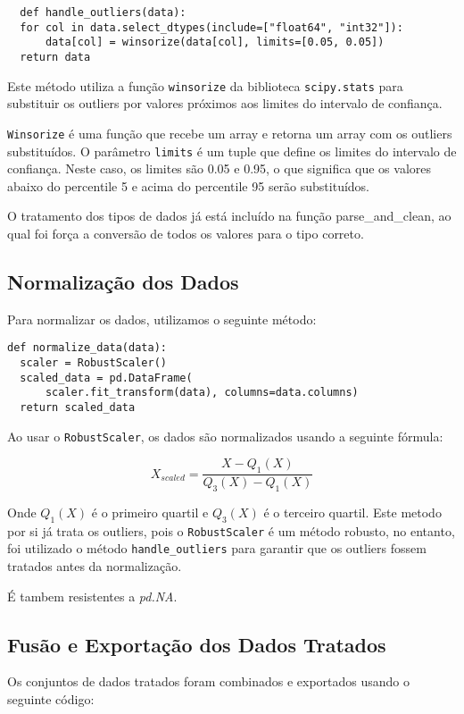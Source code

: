 \documentclass{article}
\begin{document}
\begin{verbatim}
  def handle_outliers(data):
  for col in data.select_dtypes(include=["float64", "int32"]):
      data[col] = winsorize(data[col], limits=[0.05, 0.05])
  return data
\end{verbatim}

Este método utiliza a função \texttt{winsorize} da biblioteca \texttt{scipy.stats} para substituir os outliers por valores próximos aos limites do intervalo de confiança.

\texttt{Winsorize} é uma função que recebe um array e retorna um array com os outliers substituídos. O parâmetro \texttt{limits} é um tuple que define os limites do intervalo de confiança. Neste caso, os limites são 0.05 e 0.95, o que significa que os valores abaixo do percentile 5 e acima do percentile 95 serão substituídos.

O tratamento dos tipos de dados já está incluído na função parse_and_clean, ao qual foi força a conversão de todos os valores para o tipo correto.

\subsection{Normalização dos Dados}
Para normalizar os dados, utilizamos o seguinte método:

\begin{verbatim}
def normalize_data(data):
  scaler = RobustScaler()
  scaled_data = pd.DataFrame(
      scaler.fit_transform(data), columns=data.columns)
  return scaled_data
\end{verbatim}

Ao usar o \texttt{RobustScaler}, os dados são normalizados usando a seguinte fórmula:

\begin{equation}
  X_{scaled} = \frac{X - Q_1(X)}{Q_3(X) - Q_1(X)}
\end{equation}

Onde $Q_1(X)$ é o primeiro quartil e $Q_3(X)$ é o terceiro quartil.
Este metodo por si já trata os outliers, pois o \texttt{RobustScaler} é um método robusto, no entanto, foi utilizado o método \texttt{handle\_outliers} para garantir que os outliers fossem tratados antes da normalização.

É tambem resistentes a \textit{pd.NA}.

\subsection{Fusão e Exportação dos Dados Tratados}
Os conjuntos de dados tratados foram combinados e exportados usando o seguinte código:
\end{document}

